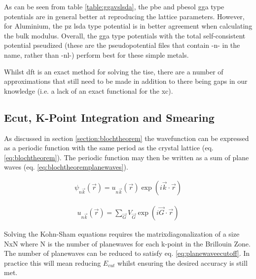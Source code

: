 As can be seen from table \ref{table:ggavslsda}, the \acrshort{pbe} and \acrshort{pbesol} \acrshort{gga} type potentials are in general better at reproducing the lattice parameters.  However, for Aluminium, the \acrshort{pz} \acrshort{lsda} type potential is in better agreement when calculating the bulk modulus.  Overall, the \acrshort{gga} type potentials with the total self-consistent potential pseudized (these are the pseudopotential files that contain -n- in the name, rather than -nl-) perform best for these simple metals.

Whilst \acrshort{dft} is an exact method for solving the \acrshort{tise}, there are a number of approximations that still need to be made in addition to there being gaps in our knowledge (i.e. a lack of an exact functional for the \acrshort{xc}).  


\subsection{Ecut, K-Point Integration and Smearing}

As discussed in section \ref{section:blochtheorem} the wavefunction can be expressed as a periodic function with the same period as the crystal lattice (eq. \ref{eq:blochtheorem}).  The periodic function may then be written as a sum of plane waves (eq. \ref{eq:blochtheoremplanewaves}).

\begin{equation}
  \begin{split}
    \psi_{n\vec{k}} (\vec{r}) = u_{n\vec{k}}(\vec{r}) \exp(i \vec{k} \cdot \vec{r})
  \end{split}
  \label{eq:blochtheorem}
\end{equation}

\begin{equation}
  \begin{split}
    u_{n\vec{k}}(\vec{r}) = \sum_{\vec{G}} V_{\vec{G}} \exp(i \vec{G} \cdot \vec{r})
  \end{split}
  \label{eq:blochtheoremplanewaves}
\end{equation}

Solving the Kohn-Sham equations requires the \gls{matrixdiagonalization} of a size NxN where N is the number of planewaves for each k-point in the Brillouin Zone\cite{energycutoff}.  The number of planewaves can be reduced to satisfy eq. \ref{eq:planewaveecutoff}.  In practice this will mean reducing $E_{cut}$ whilst ensuring the desired accuracy is still met.

